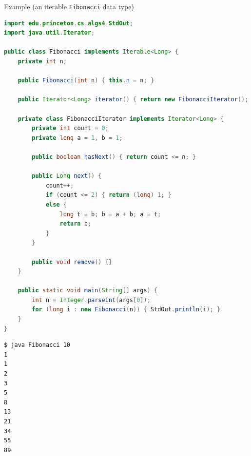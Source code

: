 \documentclass[8pt,a4paper,compress]{beamer}
\begin{document}
\begin{frame}[fragile]
\pause

Example (an iterable \lstinline{Fibonacci} data type)
\begin{lstlisting}[language=Java]
import edu.princeton.cs.algs4.StdOut;
import java.util.Iterator;

public class Fibonacci implements Iterable<Long> {
    private int n;

    public Fibonacci(int n) { this.n = n; }

    public Iterator<Long> iterator() { return new FibonacciIterator(); }

    private class FibonacciIterator implements Iterator<Long> {
        private int count = 0;
        private long a = 1, b = 1;

        public boolean hasNext() { return count <= n; }

        public Long next() {
            count++;
            if (count <= 2) { return (long) 1; }
            else { 
                long t = b; b = a + b; a = t;
                return b;
            }
        }
        
        public void remove() {}
    }

    public static void main(String[] args) {
        int n = Integer.parseInt(args[0]);
        for (long i : new Fibonacci(n)) { StdOut.println(i); }
    }
}
\end{lstlisting}
\end{frame}

\begin{frame}[fragile]
\pause

\begin{lstlisting}[language={}]
$ java Fibonacci 10
1
1
2
3
5
8
13
21
34
55
89
\end{lstlisting}
\end{frame}
\end{document}
